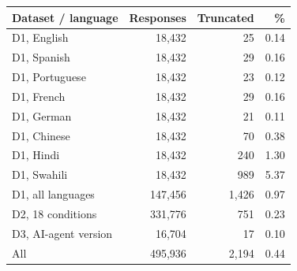 \begin{tabular}{lrrr}
\toprule
Dataset / language & Responses & Truncated & \% \\
\midrule
D1, English & 18,432 & 25 & 0.14 \\
D1, Spanish & 18,432 & 29 & 0.16 \\
D1, Portuguese & 18,432 & 23 & 0.12 \\
D1, French & 18,432 & 29 & 0.16 \\
D1, German & 18,432 & 21 & 0.11 \\
D1, Chinese & 18,432 & 70 & 0.38 \\
D1, Hindi & 18,432 & 240 & 1.30 \\
D1, Swahili & 18,432 & 989 & 5.37 \\
D1, all languages & 147,456 & 1,426 & 0.97 \\
D2, 18 conditions & 331,776 & 751 & 0.23 \\
D3, AI-agent version & 16,704 & 17 & 0.10 \\
\midrule
All & 495,936 & 2,194 & 0.44 \\
\bottomrule
\end{tabular}
